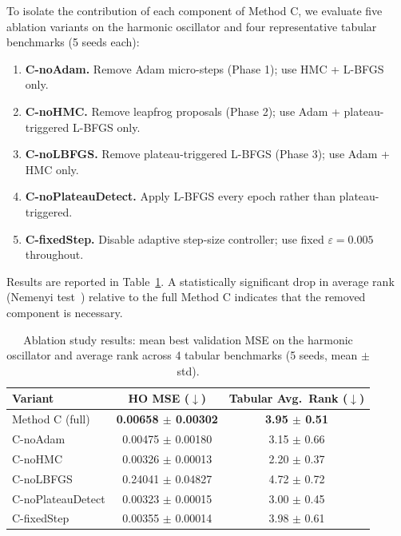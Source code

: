 \documentclass[11pt]{article}
\begin{document}
To isolate the contribution of each component of Method C, we evaluate five ablation variants on the harmonic oscillator and four representative tabular benchmarks (5 seeds each):

\begin{enumerate}

  \item[\textbf{Abl-1.}] \textbf{C-noAdam.} Remove Adam micro-steps (Phase 1); use HMC + L-BFGS only.

  \item[\textbf{Abl-2.}] \textbf{C-noHMC.} Remove leapfrog proposals (Phase 2); use Adam + plateau-triggered L-BFGS only.

  \item[\textbf{Abl-3.}] \textbf{C-noLBFGS.} Remove plateau-triggered L-BFGS (Phase 3); use Adam + HMC only.

  \item[\textbf{Abl-4.}] \textbf{C-noPlateauDetect.} Apply L-BFGS every epoch rather than plateau-triggered.

  \item[\textbf{Abl-5.}] \textbf{C-fixedStep.} Disable adaptive step-size controller; use fixed $\varepsilon=0.005$ throughout.

\end{enumerate}

Results are reported in Table~\ref{tab:ablation}. A statistically significant drop in average rank (Nemenyi test~\cite{demsar2006}) relative to the full Method C indicates that the removed component is necessary.

\begin{table}[H]
\centering
\caption{Ablation study results: mean best validation MSE on the harmonic oscillator and average rank across 4 tabular benchmarks (5 seeds, mean $\pm$ std).}
\label{tab:ablation}
\renewcommand{\arraystretch}{1.25}
\begin{tabular}{lcc}
\toprule
\textbf{Variant} & \textbf{HO MSE} ($\downarrow$)
                 & \textbf{Tabular Avg.\ Rank} ($\downarrow$) \\
\midrule
Method C (full)         & \textbf{0.00658 $\pm$ 0.00302} & \textbf{3.95 $\pm$ 0.51} \\
C-noAdam                & 0.00475 $\pm$ 0.00180 & 3.15 $\pm$ 0.66 \\
C-noHMC                 & 0.00326 $\pm$ 0.00013 & 2.20 $\pm$ 0.37 \\
C-noLBFGS               & 0.24041 $\pm$ 0.04827 & 4.72 $\pm$ 0.72 \\
C-noPlateauDetect       & 0.00323 $\pm$ 0.00015 & 3.00 $\pm$ 0.45 \\
C-fixedStep             & 0.00355 $\pm$ 0.00014 & 3.98 $\pm$ 0.61 \\
\bottomrule
\end{tabular}
\end{table}
\end{document}
